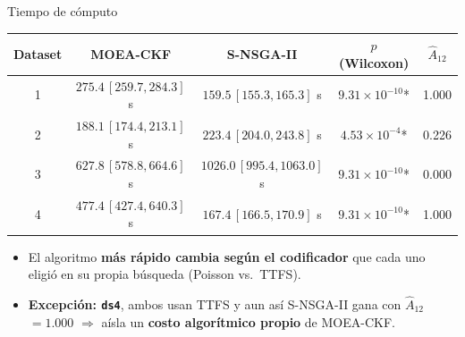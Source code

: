 \documentclass[aspectratio=169,10pt]{beamer}
\newcommand{\Atwelve}{\ensuremath{\hat{A}_{12}}}
\begin{document}
\begin{frame}{Tiempo de cómputo}
  \begin{table}
  \centering\scriptsize
  \begin{tabular}{ccccc}
    \toprule
    \textbf{Dataset} & \textbf{MOEA-CKF} & \textbf{S-NSGA-II} & \textbf{$p$ (Wilcoxon)} & \Atwelve \\
    \midrule
    1 & $275.4\,[259.7,284.3]$ s & \cellcolor{semgreen!25}$159.5\,[155.3,165.3]$ s & $9.31\times10^{-10}$* & 1.000 \\
    2 & \cellcolor{semgreen!25}$188.1\,[174.4,213.1]$ s & $223.4\,[204.0,243.8]$ s & $4.53\times10^{-4}$* & 0.226 \\
    3 & \cellcolor{semgreen!25}$627.8\,[578.8,664.6]$ s & $1026.0\,[995.4,1063.0]$ s & $9.31\times10^{-10}$* & 0.000 \\
    4 & $477.4\,[427.4,640.3]$ s & \cellcolor{semgreen!25}$167.4\,[166.5,170.9]$ s & $9.31\times10^{-10}$* & 1.000 \\
    \bottomrule
  \end{tabular}
  \end{table}
  \small
  \begin{itemize}
    \item El algoritmo \textbf{más rápido cambia según el codificador} que cada uno eligió en su propia búsqueda (Poisson vs.\ TTFS).
    \item \textbf{Excepción: \texttt{ds4}}, ambos usan TTFS y aun así S-NSGA-II gana con \Atwelve$=1.000$ $\Rightarrow$ aísla un \textbf{costo algorítmico propio} de MOEA-CKF.
  \end{itemize}
\end{frame}
\end{document}
